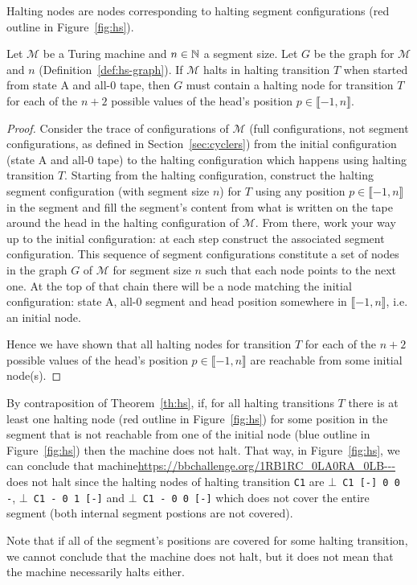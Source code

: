 \begin{definition}[\HS graph]
  Halting nodes are nodes corresponding to halting segment configurations (red outline in Figure~\ref{fig:hs}).

\end{definition}

\begin{theorem}[\HS]\label{th:hs}
  Let $\mathcal{M}$ be a Turing machine and $n \in \mathbb{N}$ a segment size. Let $G$ be the \HS graph for $\mathcal{M}$ and $n$ (Definition~\ref{def:hs-graph}). If $\mathcal{M}$ halts in halting transition $T$ when started from state A and all-0 tape, then $G$ must contain a halting node for transition $T$ for each of the $n+2$ possible values of the head's position $p \in \llbracket -1, n \rrbracket$.
\end{theorem}
\begin{proof}
  Consider the trace of configurations of $\mathcal{M}$ (full configurations, not segment configurations, as defined in Section~\ref{sec:cyclers}) from the initial configuration (state A and all-0 tape) to the halting configuration which happens using halting transition $T$. Starting from the halting configuration, construct the halting segment configuration (with segment size $n$) for $T$ using any position $p \in \llbracket -1, n \rrbracket$ in the segment and fill the segment's content from what is written on the tape around the head in the halting configuration of $\mathcal{M}$. From there, work your way up to the initial configuration: at each step construct the associated segment configuration. This sequence of segment configurations constitute a set of nodes in the \HS graph $G$ of $\mathcal{M}$ for segment size $n$ such that each node points to the next one. At the top of that chain there will be a node matching the initial configuration: state A, all-0 segment and head position somewhere in $\llbracket -1, n \rrbracket$, i.e. an initial node.

  Hence we have shown that all halting nodes for transition $T$ for each of the $n+2$ possible values of the head's position $p \in \llbracket -1, n \rrbracket$ are reachable from some initial node(s).
\end{proof}

\begin{remark}
  By contraposition of Theorem~\ref{th:hs}, if, for all halting transitions $T$ there is at least one halting node (red outline in Figure~\ref{fig:hs}) for some position in the segment that is not reachable from one of the initial node (blue outline in Figure~\ref{fig:hs}) then the machine does not halt. That way, in Figure~\ref{fig:hs}, we can conclude that machine\url{https://bbchallenge.org/1RB1RC_0LA0RA_0LB---} does not halt since the halting nodes of halting transition \texttt{C1} are \texttt{$\bot$ C1 [-] 0 0 -}, \texttt{$\bot$ C1 - 0 1 [-]} and \texttt{$\bot$ C1 - 0 0 [-]} which does not cover the entire segment (both internal segment postions are not covered).

  Note that if all of the segment's positions are covered for some halting transition, we cannot conclude that the machine does not halt, but it does not mean that the machine necessarily halts either.
\end{remark}

